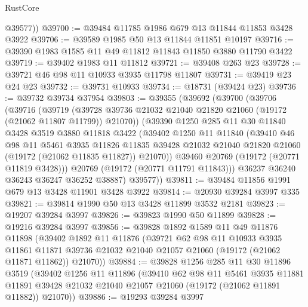 \begin{lexlean}{RustCore}
\begin{coremodule}
        @39577))
@39700 := @39484 @11785 @1986 @679 @13 @11844 @11853 @3428 @3922
@39706 := @39589 @1985 @50 @13 @11844 @11851 @10197
@39716 := @39390 @1983 @1585 @11 @49 @11812 @11843 @11850 @3880 @11790 @3422
@39719 := @39402 @1983 @11 @11812
@39721 := @39408 @263 @23
@39728 := @39721 @46 @98 @11 @10933 @3935 @11798 @11807
@39731 := @39419 @23 @24 @23
@39732 := @39731 @10933
@39734 := @18731 (@39424 @23)
@39736 := @39732 @39734 @37954
@39803 := @39355
    (@39692
      (@39700
        (@39706
          (@39716
            (@39719
              (@39728 @39736 @21032 @21040 @21820 @21060 (@19172 (@21062 @11807 @11799)) @21070))
            (@39390
              @1250
              @285
              @11
              @30
              @11840
              @3428
              @3519
              @3880
              @11818
              @3422
              (@39402
                @1250
                @11
                @11840
                (@39410
                  @46
                  @98
                  @11
                  @5461
                  @3935
                  @11826
                  @11835
                  @39428
                  @21032
                  @21040
                  @21820
                  @21060
                  (@19172 (@21062 @11835 @11827))
                  @21070))
              @39460
              @20769
              (@19172 (@20771 @11819 @3428)))
            @20769
            (@19172 (@20771 @11791 @11843)))
          @36237
          @36240
          @36243
          @36247
          @36252
          @38887)
        @39577))
@39811 := @39484 @11856 @1991 @679 @13 @3428 @11901 @3428 @3922
@39814 := @20930 @39284 @3997 @335
@39821 := @39814 @1990 @50 @13 @3428 @11899 @3532 @2181
@39823 := @19207 @39284 @3997
@39826 := @39823 @1990 @50 @11899
@39828 := @19216 @39284 @3997
@39856 := @39828
    @1892
    @1589
    @11
    @49
    @11876
    @11898
    (@39402
      @1892
      @11
      @11876
      (@39721
        @62
        @98
        @11
        @10933
        @3935
        @11861
        @11871
        @39736
        @21032
        @21040
        @21057
        @21060
        (@19172 (@21062 @11871 @11862))
        @21070))
@39884 := @39828
    @1256
    @285
    @11
    @30
    @11896
    @3519
    (@39402
      @1256
      @11
      @11896
      (@39410
        @62
        @98
        @11
        @5461
        @3935
        @11881
        @11891
        @39428
        @21032
        @21040
        @21057
        @21060
        (@19172 (@21062 @11891 @11882))
        @21070))
@39886 := @19293 @39284 @3997

\end{coremodule}
\end{lexlean}
